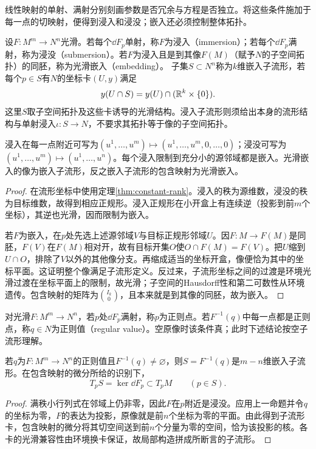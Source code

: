 线性映射的单射、满射分别刻画参数是否冗余与方程是否独立。将这些条件施加于每一点的切映射，便得到浸入和浸没；嵌入还必须控制整体拓扑。
\begin{definition}[浸入、浸没与嵌入]
设$F:M^m\to N^n$光滑。若每个$\dd F_p$单射，称$F$为浸入（immersion）；若每个$\dd F_p$满射，称为浸没（submersion）。若$F$为浸入且是到其像$F(M)$（赋予$N$的子空间拓扑）的同胚，称为光滑嵌入（embedding）。
子集$S\subset N^n$称为$k$维嵌入子流形，若每个$p\in S$有$N$的坐标卡$(U,y)$满足
\[
 y(U\cap S)=y(U)\cap(\mathbb{R}^k\times\{0\}).
\]
这里$S$取子空间拓扑及这些卡诱导的光滑结构。浸入子流形则须给出本身的流形结构与单射浸入$\iota:S\to N$，不要求其拓扑等于像的子空间拓扑。
\end{definition}
\begin{theorem}[局部正规形与嵌入的像]\label{thm:immersion-submersion}
浸入在每一点附近可写为$(u^1,\ldots,u^m)\mapsto(u^1,\ldots,u^m,0,\ldots,0)$；浸没可写为$(u^1,\ldots,u^m)\mapsto(u^1,\ldots,u^n)$。每个浸入限制到充分小的源邻域都是嵌入。光滑嵌入的像为嵌入子流形，反之嵌入子流形的包含映射为光滑嵌入。
\end{theorem}
\begin{proof}
在流形坐标中使用定理\ref{thm:constant-rank}。浸入的秩为源维数，浸没的秩为目标维数，故得到相应正规形。浸入正规形在小开盒上有连续逆（投影到前$m$个坐标），其逆也光滑，因而限制为嵌入。

若$F$为嵌入，在$p$处先选上述源邻域$V$与目标正规形邻域$U$。因$F:M\to F(M)$是同胚，$F(V)$在$F(M)$相对开，故有目标开集$O$使$O\cap F(M)=F(V)$。把$U$缩到$U\cap O$，排除了$V$以外的其他像分支。再缩成适当的坐标开盒，像便恰为其中的坐标平面。这证明整个像满足子流形定义。反过来，子流形坐标之间的过渡是环境光滑过渡在坐标平面上的限制，故光滑；子空间的Hausdorff性和第二可数性从环境遗传。包含映射的矩阵为$\binom{I_k}{0}$，且本来就是到其像的同胚，故为嵌入。
\end{proof}
\begin{definition}[正则值]
对光滑$F:M^m\to N^n$，若$p$处$\dd F_p$满射，称$p$为正则点。若$F^{-1}(q)$中每一点都是正则点，称$q\in N$为正则值（regular value）。空原像时该条件真；此时下述结论按空子流形理解。
\end{definition}
\begin{theorem}[正则值定理与切空间]\label{thm:regular-value}
若$q$为$F:M^m\to N^n$的正则值且$F^{-1}(q)\ne\varnothing$，则$S=F^{-1}(q)$是$m-n$维嵌入子流形。在包含映射的微分所给的识别下，
\[
 T_pS=\ker\dd F_p\subset T_pM\qquad(p\in S).
\]
\end{theorem}
\begin{proof}
满秩小行列式在邻域上仍非零，因此$F$在$p$附近是浸没。应用上一命题并令$q$的坐标为零，$F$的表达为投影，原像就是前$n$个坐标为零的平面。由此得到子流形卡，包含映射的微分将其切空间送到前$n$个分量为零的空间，恰为该投影的核。各卡的光滑兼容性由环境换卡保证，故局部构造拼成所断言的子流形。
\end{proof}
